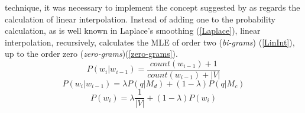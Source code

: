 technique, it was necessary to implement the concept suggested by \cite{11} as 
regards the calculation of linear interpolation. Instead of adding one to 
the probability calculation, as is well known in Laplace's smoothing (\ref{Laplace}), linear 
interpolation, recursively, calculates the MLE of order two (\emph{bi-grams}) (\ref{LinInt}), up to 
the order zero (\emph{zero-grams})(\ref{zero-grams}).
\begin{equation}\label{Laplace}
    P(w_i|w_{i-1}) = \frac{count(w_{i-1})+1}{count(w_{i-1})+|V|}
\end{equation}
\begin{equation}\label{LinInt}
    P(w_i|w_{i-1}) = \lambda P(q|M_d) + (1-\lambda)P(q|M_c)
\end{equation}
\begin{equation}\label{zero-grams}
    P(w_i) = \lambda \frac{1}{|V|} + (1-\lambda)P(w_i)
\end{equation}

